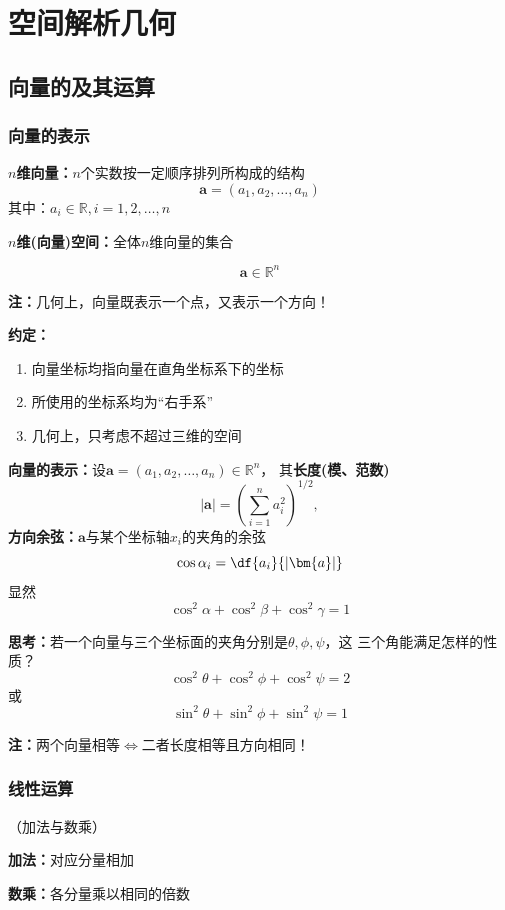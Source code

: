 \setcounter{chapter}{7}

\chapter{空间解析几何}

\section{向量的及其运算}

\subsection{向量的表示}

{\bf $n$维向量：}$n$个实数按一定顺序排列所构成的结构
$$\bm{a}=(a_1,a_2,\ldots,a_n)$$
其中：$a_i\in\mathbb{R},i=1,2,\ldots,n$

{\bf $n$维(向量)空间：}全体$n$维向量的集合

$$\bm{a}\in\mathbb{R}^n$$

{\bf 注：}几何上，向量既表示一个点，又表示一个方向！

{\bf 约定：}

\begin{enumerate}[(1)]
  \setlength{\itemindent}{1cm}
  \item 向量坐标均指向量在直角坐标系下的坐标
  \item 所使用的坐标系均为“右手系”
  \item 几何上，只考虑不超过三维的空间
\end{enumerate}

{\bf 向量的表示：}设$\bm{a}=(a_1,a_2,\ldots,a_n)\in\mathbb{R}^n$，
其{\bf 长度(模、范数)}
$$|\bm{a}|=\left(\sum\limits_{i=1}^na_i^2\right)^{1/2},$$
{\bf 方向余弦：}$\bm{a}$与某个坐标轴$x_i$的夹角的余弦
$$\cos\alpha_i=\df{a_i}{|\bm{a}|}$$
显然
$$\cos^2\alpha+\cos^2\beta+\cos^2\gamma=1$$

{\bf 思考：}若一个向量与三个坐标面的夹角分别是$\theta,\phi,\psi$，这
三个角能满足怎样的性质？
$$\cos^2\theta+\cos^2\phi+\cos^2\psi=2$$
或
$$\sin^2\theta+\sin^2\phi+\sin^2\psi=1$$

{\bf 注：}两个向量相等$\Leftrightarrow$二者长度相等且方向相同！

\subsection{线性运算}（加法与数乘）

{\bf 加法：}对应分量相加

{\bf 数乘：}各分量乘以相同的倍数

